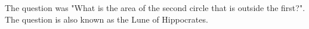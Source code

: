 \documentclass{report}
\begin{document}
\begin{description}
\begin{mdframed}
            The question was "What is the area of the second
            circle that is outside the first?". The question
            is also known as the Lune of Hippocrates.


        \end{mdframed}
\end{description}
\end{document}
